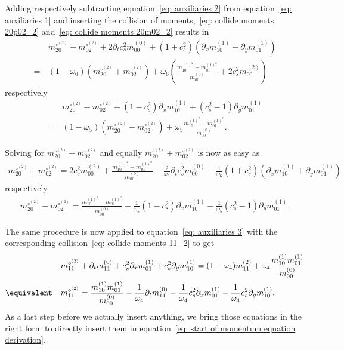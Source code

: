Adding respectively subtracting equation~\eqref{eq: auxiliaries 2} from equation~\eqref{eq: auxiliaries 1} and inserting the collision of
moments,~\eqref{eq: collide moments 20p02_2} and~\eqref{eq: collide moments 20m02_2} results in
\begin{align}
  \nonumber
  &m_{20}^{\circ^{(2)}} + m_{02}^{\circ^{(2)}} + 2\partial_t c_s^2 m_{00}^{(0)} + (1+c_s^2)(\partial_x m_{10}^{(1)} + \partial_y m_{01}^{(1)})
  \\=\,&
  \label{eq: auxiliaries 4}
  (1-\omega_6)\left(  m_{20}^{\circ^{(2)}} + m_{02}^{\circ^{(2)}}\right)
  + \omega_6 \left( \frac{ m_{10}^{{(1)}^2} + m_{01}^{{(1)}^2}}{m_{00}^{(0)}}
  + 2 c_s^2 m_{00}^{(2)} \right)
\end{align}
respectively
\begin{align}
  \nonumber
  &m_{20}^{\circ^{(2)}} - m_{02}^{\circ^{(2)}} + (1 - c_s^2)\partial_x m_{10}^{(1)} + (c_s^2 - 1)\partial_y m_{01}^{(1)}
  \\=\,&
  \label{eq: auxiliaries 5}
  (1-\omega_5) \left(m_{20}^{\circ^{(2)}}-m_{02}^{\circ^{(2)}}\right) + \omega_5 \frac{ m_{10}^{{(1)}^2} - m_{01}^{{(1)}^2}}{m_{00}^{(0)}}.
\end{align}

Solving for $m_{20}^{\circ^{(2)}} + m_{02}^{\circ^{(2)}}$ and equally $m_{20}^{\circ^{(2)}} + m_{02}^{\circ^{(2)}}$ is now as easy as
\begin{align}
  \label{eq: auxiliaries 6}
  m_{20}^{\circ^{(2)}} + m_{02}^{\circ^{(2)}}
  =
  2 c_s^2 m_{00}^{(2)}
  + \frac{ m_{10}^{{(1)}^2} + m_{01}^{{(1)}^2}}{m_{00}^{(0)}}
  - \frac{2}{\omega_6}\partial_t c_s^2 m_{00}^{(0)}
  - \frac{1}{\omega_6}(1+c_s^2)(\partial_x m_{10}^{(1)} + \partial_y m_{01}^{(1)})
\end{align}
respectively
\begin{align}
  \label{eq: auxiliaries 7}
  m_{20}^{\circ^{(2)}} - m_{02}^{\circ^{(2)}}
  =
   \frac{ m_{10}^{{(1)}^2} - m_{01}^{{(1)}^2}}{m_{00}^{(0)}}
   - \frac{1}{\omega_5} (1 - c_s^2)\partial_x m_{10}^{(1)}
   - \frac{1}{\omega_5} (c_s^2 - 1)\partial_y m_{01}^{(1)}.
\end{align}

The same procedure is now applied to equation~\eqref{eq: auxiliaries 3} with the corresponding collision~\eqref{eq: collide moments 11_2} to get
\begin{align}
  \label{eq: auxiliaries 8}
  &m_{11}^{\circ^{(2)}} + \partial_t m_{11}^{(0)} + c_s^2\partial_x m_{01}^{(1)} + c_s^2\partial_y m_{10}^{(1)} =  (1-\omega_4)m_{11}^{(2)} + \omega_4 \frac{ m_{10}^{(1)}m_{01}^{(1)}}{m_{00}^{(0)}}
  \\
  \equivalent\quad
  &m_{11}^{\circ^{(2)}}
  =
  \frac{ m_{10}^{(1)}m_{01}^{(1)}}{m_{00}^{(0)}}
  - \frac{1}{\omega_4} \partial_t m_{11}^{(0)}
  - \frac{1}{\omega_4} c_s^2\partial_x m_{01}^{(1)}
  - \frac{1}{\omega_4} c_s^2\partial_y m_{10}^{(1)}
  .
\end{align}
As a last step before we actually insert anything, we bring those equations in the right form to directly insert them in equation~\eqref{eq: start of momentum equation derivation}.

